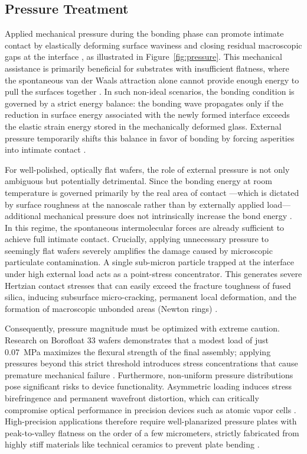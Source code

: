 \subsection{Pressure Treatment}
\label{sec:pressure}

Applied mechanical pressure during the bonding phase can promote intimate
contact by elastically deforming surface waviness and closing residual
macroscopic gaps at the interface \cite{mai2015, trinh2022}, as illustrated in
Figure~\ref{fig:pressure}. This mechanical assistance is primarily beneficial 
for substrates with insufficient flatness, where the spontaneous van der Waals
attraction alone cannot provide enough energy to pull the surfaces together
\cite{turner2006, kalk2014}. In such non-ideal scenarios, the bonding condition 
is governed by a strict energy balance: the bonding wave propagates only if the 
reduction in surface energy associated with the newly formed interface exceeds 
the elastic strain energy stored in the mechanically deformed glass. External 
pressure temporarily shifts this balance in favor of bonding by forcing 
asperities into intimate contact \cite{turner2006, turner2002}.

For well-polished, optically flat wafers, the role of external pressure is
not only ambiguous but potentially detrimental. Since the bonding energy at room 
temperature is governed primarily by the real area of contact ---which is dictated 
by surface roughness at the nanoscale rather than by externally applied 
load--- additional mechanical pressure does not intrinsically increase the 
bond energy \cite{miki2003, takagi1998}. In this regime, the spontaneous 
intermolecular forces are already sufficient to achieve full intimate contact. 
Crucially, applying unnecessary pressure to seemingly flat wafers severely 
amplifies the damage caused by microscopic particulate contamination. A single 
sub-micron particle trapped at the interface under high external load acts as 
a point-stress concentrator. This generates severe Hertzian contact stresses 
that can easily exceed the fracture toughness of fused silica, inducing 
subsurface micro-cracking, permanent local deformation, and the formation of 
macroscopic unbonded areas (Newton rings) \cite{rammhandbook, gosele1998}. 

Consequently, pressure magnitude must be optimized with extreme caution. 
Research on Borofloat 33 wafers demonstrates that a modest load of just 
\SI{0.07}{\mega\pascal} maximizes the flexural strength of the final assembly; applying 
pressures beyond this strict threshold introduces stress concentrations that 
cause premature mechanical failure \cite{trinh2022}. Furthermore, non-uniform 
pressure distributions pose significant risks to device functionality. Asymmetric 
loading induces stress birefringence and permanent wavefront distortion, which 
can critically compromise optical performance in precision devices such as 
atomic vapor cells \cite{bain2022, wang2014}. High-precision applications 
therefore require well-planarized pressure plates with peak-to-valley flatness 
on the order of a few micrometers, strictly fabricated from highly stiff 
materials like technical ceramics to prevent plate bending \cite{birckigt2021}.

